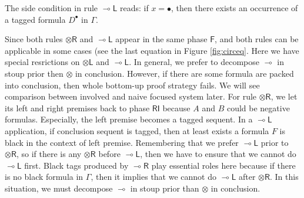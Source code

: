 \documentclass[submission,copyright,creativecommons]{eptcs}
\theoremstyle{definition}
\newcommand{\tl}{\otimes \mathsf{L}}
\newcommand{\tr}{\otimes \mathsf{R}}
\newcommand{\lright}{{\multimap}\mathsf{R}}
\newcommand{\lleft}{{\multimap}\mathsf{L}}
\newcommand{\ot}{\otimes}
\newcommand{\lolli}{\multimap}
\newcommand{\RI}{\mathsf{RI}}
\newcommand{\Pass}{\mathsf{P}}
\newcommand{\F}{\mathsf{F}}
\begin{document}
The side condition in rule $\lleft$ reads: if $x = \bullet$, then there exists an occurrence of a tagged formula $D^\bullet$ in $\Gamma$.


Since both rules $\tr$ and $\lleft$ appear in the same phase $\F$, and both rules can be applicable in some cases (see the last equation in Figure \ref{fig:circeq}.
  Here we have special resrictions on $\tl$ and $\lleft$.
  In general, we prefer to decompose $\lolli$ in stoup prior then $\ot$ in conclusion.
  However, if there are some formula are packed into conclusion, then whole bottom-up proof strategy fails.
  We will see comparison between involved and naive focused system later.
  For rule $\tr$, we let its left and right premises back to phase $\RI$ because $A$ and $B$ could be negative formulas.
  Especially, the left premise becomes a tagged sequent.
  In a $\lleft$ application, if conclusion sequent is tagged, then at least exists a formula $F$ is black in the context of left premise.
  Remembering that we prefer $\lleft$ prior to $\tr$, so if there is any $\tr$ before $\lleft$, then we have to ensure that we cannot do $\lleft$ first.
  Black tags produced by $\lright$ play essential roles here because if there is no black formula in $\Gamma$, then it implies that we cannot do $\lleft$ after $\tr$.
  In this situation, we must decompose $\lolli$ in stoup prior than $\ot$ in conclusion.
\end{document}
